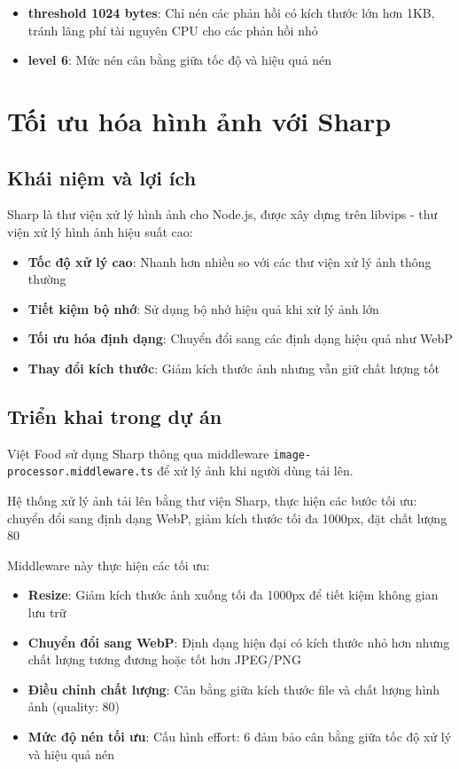 \begin{itemize}
    \item \textbf{threshold 1024 bytes}: Chỉ nén các phản hồi có kích thước lớn hơn 1KB, tránh lãng phí tài nguyên CPU cho các phản hồi nhỏ
    \item \textbf{level 6}: Mức nén cân bằng giữa tốc độ và hiệu quả nén
\end{itemize}

\section{Tối ưu hóa hình ảnh với Sharp}

\subsection{Khái niệm và lợi ích}
Sharp là thư viện xử lý hình ảnh cho Node.js, được xây dựng trên libvips - thư viện xử lý hình ảnh hiệu suất cao:

\begin{itemize}
    \item \textbf{Tốc độ xử lý cao}: Nhanh hơn nhiều so với các thư viện xử lý ảnh thông thường
    \item \textbf{Tiết kiệm bộ nhớ}: Sử dụng bộ nhớ hiệu quả khi xử lý ảnh lớn
    \item \textbf{Tối ưu hóa định dạng}: Chuyển đổi sang các định dạng hiệu quả như WebP
    \item \textbf{Thay đổi kích thước}: Giảm kích thước ảnh nhưng vẫn giữ chất lượng tốt
\end{itemize}

\subsection{Triển khai trong dự án}
Việt Food sử dụng Sharp thông qua middleware \texttt{image-processor.middleware.ts} để xử lý ảnh khi người dùng tải lên.

Hệ thống xử lý ảnh tải lên bằng thư viện Sharp, thực hiện các bước tối ưu: chuyển đổi sang định dạng WebP, giảm kích thước tối đa 1000px, đặt chất lượng 80%

Middleware này thực hiện các tối ưu:

\begin{itemize}
    \item \textbf{Resize}: Giảm kích thước ảnh xuống tối đa 1000px để tiết kiệm không gian lưu trữ
    \item \textbf{Chuyển đổi sang WebP}: Định dạng hiện đại có kích thước nhỏ hơn nhưng chất lượng tương đương hoặc tốt hơn JPEG/PNG
    \item \textbf{Điều chỉnh chất lượng}: Cân bằng giữa kích thước file và chất lượng hình ảnh (quality: 80)
    \item \textbf{Mức độ nén tối ưu}: Cấu hình effort: 6 đảm bảo cân bằng giữa tốc độ xử lý và hiệu quả nén
\end{itemize}

